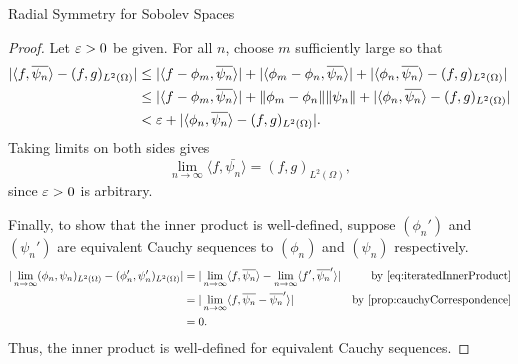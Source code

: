 \begin{chapter}{Radial Symmetry for Sobolev Spaces}
\begin{proof}
Let $\varepsilon > 0$ be given. 
For all $n$, choose $m$ sufficiently large so that
\begin{align}
  |\langle f,\overline{\psi_n}\rangle - (f,g)_{L^2(\Omega)}| 
    &\le |\langle f - \phi_m,\overline{\psi_n}\rangle| + |\langle \phi_m - \phi_n, \overline{\psi_n}\rangle| + |\langle \phi_n,\overline{\psi_n}\rangle - (f,g)_{L^2(\Omega)}| \nonumber\\
    &\le |\langle f - \phi_m,\overline{\psi_n}\rangle| + \| \phi_m - \phi_n\| \|\psi_n\| + |\langle \phi_n,\overline{\psi_n}\rangle - (f,g)_{L^2(\Omega)}| \nonumber\\
    &< \varepsilon +|\langle \phi_n,\overline{\psi_n}\rangle - (f,g)_{L^2(\Omega)}|.
\end{align}
Taking limits on both sides gives 
\begin{equation} \label{eq:iteratedInnerProduct}
  \lim_{n\to\infty} \langle f,\bar{\psi_n}\rangle = (f,g)_{L^2(\Omega)}, 
\end{equation}
since $\varepsilon>0$ is arbitrary.

Finally, to show that the inner product is well-defined, suppose $(\phi_n')$ and $(\psi_n')$ are equivalent Cauchy sequences to $(\phi_n)$ and $(\psi_n)$ respectively.
\begin{align}
  |\lim_{n\to\infty}(\phi_n,\psi_n)_{L^2(\Omega)} - (\phi_n',\psi_n')_{L^2(\Omega)}| 
  &= |\lim_{n\to\infty}\langle f,\bar{\psi_n}\rangle - \lim_{n\to\infty}\langle f',\bar{\psi_n}'\rangle| &\text{by \eqref{eq:iteratedInnerProduct}}\nonumber\\
  &= |\lim_{n\to\infty}\langle f,\bar{\psi_n} - \bar{\psi_n}'\rangle| &\text{by \Cref{prop:cauchyCorrespondence}}\nonumber \\
  &= 0 \nonumber.
\end{align}
Thus, the inner product is well-defined for equivalent Cauchy sequences.
\end{proof}


\end{chapter}
